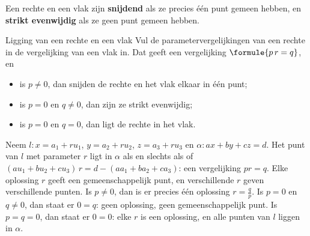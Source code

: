 
\begin{theorie}
Een rechte en een vlak zijn \textbf{\textcolor{accent}{snijdend}} als ze precies één punt gemeen hebben, en \textbf{\textcolor{accent}{strikt evenwijdig}} als ze geen punt gemeen hebben.
\begin{stelling}{Ligging van een rechte en een vlak}
Vul de parametervergelijkingen van een rechte in de vergelijking van een vlak in. Dat geeft een vergelijking $\formule{p\,r = q}$, en
\begin{itemize}
\item is $p \neq 0$, dan snijden de rechte en het vlak elkaar in één punt;
\item is $p = 0$ en $q \neq 0$, dan zijn ze strikt evenwijdig;
\item is $p = 0$ en $q = 0$, dan ligt de rechte in het vlak.
\end{itemize}
\end{stelling}
\begin{bewijs}
Neem $l\colon x = a_1 + ru_1$, $y = a_2 + ru_2$, $z = a_3 + ru_3$ en $\alpha\colon ax + by + cz = d$. Het punt van $l$ met parameter $r$ ligt in $\alpha$ als en slechts als
of $(au_1 + bu_2 + cu_3)\,r = d - (aa_1 + ba_2 + ca_3)$: een vergelijking $pr = q$. Elke oplossing $r$ geeft een gemeenschappelijk punt, en verschillende $r$ geven verschillende punten. Is $p \neq 0$, dan is er precies één oplossing $r = \frac{q}{p}$. Is $p = 0$ en $q \neq 0$, dan staat er $0 = q$: geen oplossing, geen gemeenschappelijk punt. Is $p = q = 0$, dan staat er $0 = 0$: elke $r$ is een oplossing, en alle punten van $l$ liggen in $\alpha$.
\end{bewijs}
\end{theorie}


